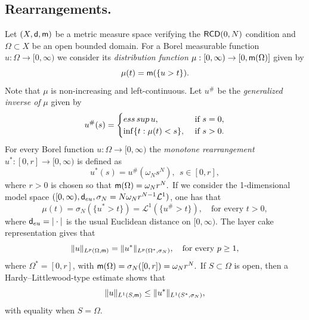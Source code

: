 \documentclass[11pt, reqno]{amsart}
\numberwithin{equation}{section}
\begin{document}
	
	
	
\subsection{Rearrangements.} Let $(X,{\sf d}, {\sf m})$ be a metric measure space verifying the ${\sf RCD}(0,N)$ condition and  $\Omega\subset X$ be an open bounded domain. For a Borel measurable function $u\colon 
	\Omega\to[0,\infty)$ we consider its \textit{distribution function} $\mu:[0,\infty)\to [0,{\sf m}(\Omega)]$ given by 
	$$\mu(t)={\sf m}(\{u>t\}).$$
	Note that $\mu$ is non-increasing and left-continuous. Let $u^\#$ be the \textit{generalized inverse of} $\mu$ given by
	$$u^\#(s)=\begin{cases}
		{\rm ess\,sup}\, u, &\text{ if }s=0,\\
		\inf\{t:\mu(t)<s\}, &\text{ if }s>0.
	\end{cases}$$
	For every Borel  function $u\colon \Omega\to[0,\infty)$ the \textit{monotone rearrangement} ${u^*}\colon[0,r]\to[0,\infty)$ is defined as
	$$u^*(s)=u^\#(\omega_N s^N),\ \ s\in [0,r],$$
	where  $r>0$ is chosen so that ${\sf m}(\Omega)=\omega_N r^N.$ If we consider the 1-dimensional model space $([0,\infty),{\sf d}_{\rm eu},\sigma_N=N\omega_Nr^{N-1}\mathcal L^1)$, one has  that
	 $$\mu(t)=\sigma_N(\{u^*>t\})=\mathcal L^1(\{u^\#>t\}), \quad \text{for every $t>0$}, $$
	where ${\sf d}_{\rm eu}=|\cdot|$ is the usual Euclidean distance on $[0,\infty)$. 
		The layer cake representation gives that 
		\begin{equation}\label{equimeasure}
		\|u\|_{L^p(\Omega,{\sf m})}=\|u^*\|_{L^p(\Omega^*,\sigma_N)},  \quad \text{for every } p\geq 1,
	\end{equation} 
	where $\Omega^*=[0,r]$, with $ {\sf m}(\Omega)=\sigma_N([0,r])=\omega_N r^N.$ 
	If $S\subset \Omega$ is open, then a Hardy--Littlewood-type estimate shows that  
	\begin{equation}\label{Hardy-Littlewood}
		\|u\|_{L^1(S,{\sf m})}\leq \|u^*\|_{L^1(S^*,\sigma_N)},
	\end{equation}
	with equality when $S= \Omega$. 
	
		
	
\end{document}
